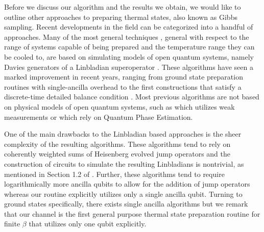 \documentclass[11pt]{article}
\begin{document}
Before we discuss our algorithm and the results we obtain, we would like to outline other approaches to preparing thermal states, also known as Gibbs sampling. Recent developments in the field \cite{chen2023quantumthermalstatepreparation, gilyen2024quantumgeneralizationsglaubermetropolis, motlagh2024ground, motta2019, ding2024single} can be categorized into a handful of approaches. Many of the most general techniques \cite{chen2023quantumthermalstatepreparation, gilyen2024quantumgeneralizationsglaubermetropolis}, general with respect to the range of systems capable of being prepared and the temperature range they can be cooled to, are based on simulating models of open quantum systems, namely Davies generators of a Linbladian superoperator \cite{davies1974markovian}. These algorithms have seen a marked improvement in recent years, ranging from ground state preparation routines with single-ancilla overhead \cite{ding2024single} to the first constructions that satisfy a discrete-time detailed balance condition \cite{gilyen2024quantumgeneralizationsglaubermetropolis}. Most previous algorithms are not based on physical models of open quantum systems, such as \cite{zhang2023dissipative} which utilizes weak measurements or \cite{poulin2009sampling, jiang2024quantummetropolissamplingweak} which rely on Quantum Phase Estimation.
  
One of the main drawbacks to the Linbladian based approaches is the sheer complexity of the resulting algorithms. These algorithms tend to rely on coherently weighted sums of Heisenberg evolved jump operators and the construction of circuits to simulate the resulting Linbladians is nontrivial, as mentioned in Section 1.2 of \cite{gilyen2024quantumgeneralizationsglaubermetropolis}. Further, these algorithms tend to require logarithmically more ancilla qubits to allow for the addition of jump operators whereas our routine explicitly utilizes only a single ancilla qubit. Turning to ground states specifically, there exists single ancilla algorithms \cite{ding2024single}  but we remark that our channel is the first general purpose thermal state preparation routine for finite $\beta$ that utilizes only one qubit explicitly. 
\end{document}
